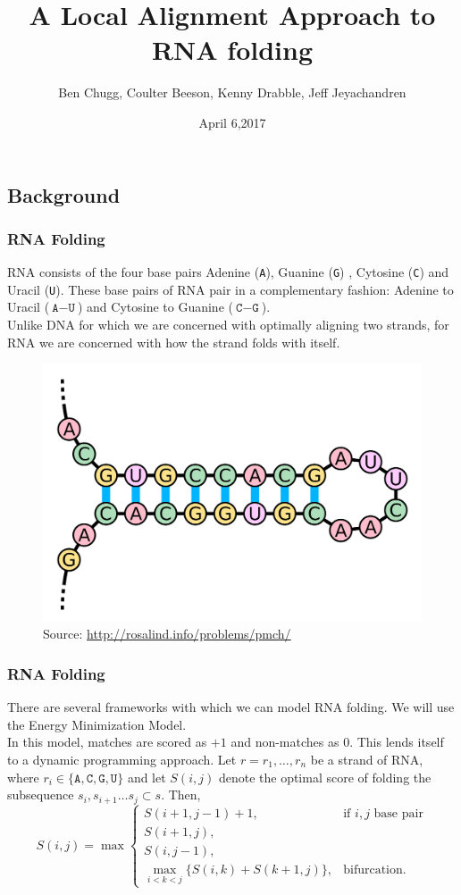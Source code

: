 \documentclass{beamer}
\title{A Local Alignment Approach to RNA folding}
\author{Ben Chugg, Coulter Beeson, Kenny Drabble, Jeff Jeyachandren}
\institute{\textsc{The University of British Columbia}}
\date{April 6,2017}
\newcommand{\A}{\texttt{A}}
\newcommand{\G}{\texttt{G}}
\newcommand{\U}{\texttt{U}}
\newcommand{\C}{\texttt{C}}
\begin{document}
\begin{frame}
\titlepage
\end{frame}


\begin{frame}
\section*{Background}
\frametitle{RNA Folding}
RNA consists of the four base pairs Adenine (\A), Guanine (\G) , Cytosine (\C) and Uracil (\U). These base pairs of RNA pair in a complementary fashion: Adenine to Uracil ($\A-\U$) and Cytosine to Guanine ($\C-\G$). \\

Unlike DNA for which we are concerned with optimally aligning two strands, for RNA we are concerned with how the strand folds with itself. 

\begin{figure}
\centering
\includegraphics[scale=0.07]{images/hairpin_loop.png}
\vspace{-0.2cm}
\caption{Source: \url{http://rosalind.info/problems/pmch/}}
\end{figure}
\end{frame}

\begin{frame}
\frametitle{RNA Folding}
There are several frameworks with which we can model RNA folding. We will use the Energy Minimization Model. \\

In this model, matches are scored as $+1$ and non-matches as 0. This lends itself to a dynamic programming approach. Let $r=r_1,\ldots,r_n$ be a strand of RNA, where $r_i\in\{\A,\C,\G,\U\}$ and let $S(i,j)$ denote the optimal score of folding the subsequence $s_i,s_{i+1}\ldots s_j\subset s$. Then, 
\[S(i,j)=\max\begin{cases}
S(i+1,j-1)+1,&\text{if }i,j\text{ base pair}\\
S(i+1,j),\\
S(i,j-1),\\
\displaystyle \max_{i<k<j}\{S(i,k)+S(k+1,j)\},&\text{bifurcation}.
\end{cases}\]
\end{frame}
\end{document}
